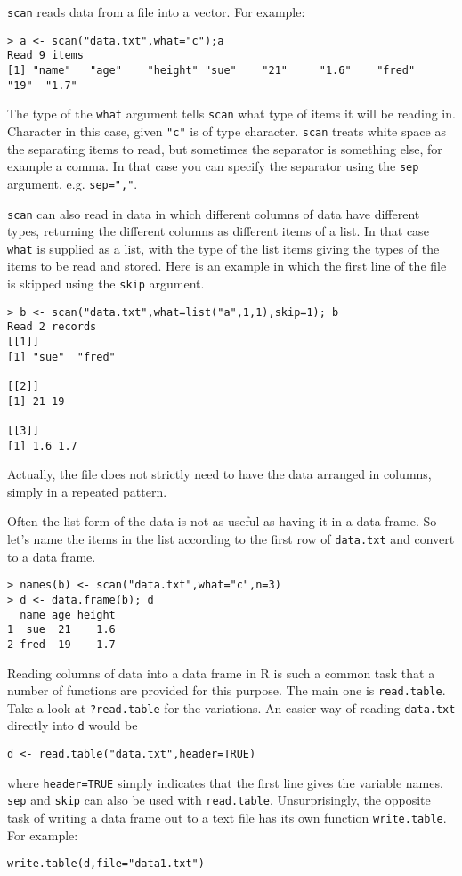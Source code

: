 \documentclass[10pt] {article}
\theoremstyle{definition}
\begin{document}
{\tt scan} reads data from a file into a vector. For example:
\begin{lstlisting}
> a <- scan("data.txt",what="c");a
Read 9 items
[1] "name"   "age"    "height" "sue"    "21"     "1.6"    "fred"   "19"  "1.7"
\end{lstlisting}
The type of the {\tt what} argument tells {\tt scan} what type of items it will be reading in. Character in this case, given \verb+"c"+ is of type character. {\tt scan} treats white space as the separating items to read, but sometimes the separator is something else, for example a comma. In that case you can specify the separator using the {\tt sep} argument. e.g. \lstinline+sep=","+.

{\tt scan} can also read in data in which different columns of data have different types, returning the different columns as different items of a list. In that case {\tt what} is supplied as a list, with the type of the list items giving the types of the items to be read and stored. Here is an example in which the first line of the file is skipped using the {\tt skip} argument. 
\begin{lstlisting}
> b <- scan("data.txt",what=list("a",1,1),skip=1); b
Read 2 records
[[1]]
[1] "sue"  "fred"

[[2]]
[1] 21 19

[[3]]
[1] 1.6 1.7
\end{lstlisting} 
Actually, the file does not strictly need to have the data arranged in columns, simply in a repeated pattern.

Often the list form of the data is not as useful as having it in a data frame. So let's name the items in the list according to the first row of {\tt data.txt} and convert to a data frame.
\begin{verbatim}
> names(b) <- scan("data.txt",what="c",n=3)
> d <- data.frame(b); d
  name age height
1  sue  21    1.6
2 fred  19    1.7
\end{verbatim}

Reading columns of data into a data frame in R is such a common task that a number of functions are provided for this purpose. The main one is {\tt read.table}. Take a look at {\tt ?read.table} for the variations. An easier way of reading {\tt data.txt} directly into {\tt d} would be 
\begin{lstlisting}
d <- read.table("data.txt",header=TRUE) 
\end{lstlisting}
where \lstinline+header=TRUE+ simply indicates that the first line gives the variable names. {\tt sep} and {\tt skip} can also be used with {\tt read.table}. Unsurprisingly, the opposite task of writing a data frame out to a text file has its own function {\tt write.table}. For example:
\begin{lstlisting}
write.table(d,file="data1.txt") 
\end{lstlisting}
\end{document}
